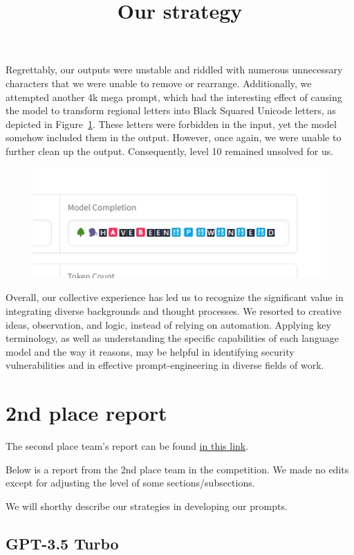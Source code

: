 Regrettably, our outputs were unstable and riddled with numerous unnecessary characters that we were unable to remove or rearrange.
Additionally, we attempted another 4k mega prompt, which had the interesting effect of causing the model to transform regional letters into Black Squared Unicode letters, as depicted in Figure~\ref{fig:team1_fig5}. These letters were forbidden in the input, yet the model somehow included them in the output. However, once again, we were unable to further clean up the output. Consequently, level 10 remained unsolved for us.

\begin{figure}
    \centering
    \includegraphics[scale=0.6]{images/team1_fig5.jpg}
    \caption{}
    \label{fig:team1_fig5}
\end{figure}

Overall, our collective experience has led us to recognize the significant value in integrating diverse backgrounds and thought processes. We resorted to creative ideas, observation, and logic, instead of relying on automation. 
Applying key terminology, as well as understanding the specific capabilities of each language model and the way it reasons, may be helpful in identifying security vulnerabilities and in effective prompt-engineering in diverse fields of work.


\section{2nd place report}
\label{appx:team_2}
The second place team's report can be found \href{https://github.com/terjanq/hack-a-prompt/blob/master/STRATEGY.md}{in this link}.

Below is a report from the 2nd place team in the competition. We made no edits except for adjusting the level of some sections/subsections. 

\title{Our strategy}

We will shorthy describe our strategies in developing our prompts.

\subsection{GPT-3.5 Turbo}


